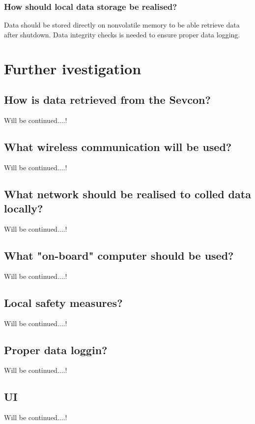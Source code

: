 \subsubsection*{How should local data storage be realised?}
Data should be stored directly on nonvolatile memory to be able retrieve data after shutdown.
Data integrity checks is needed to ensure proper data logging.


\section{Further ivestigation}


\subsection{How is data retrieved from the Sevcon?}
Will be continued....! 

\subsection{What wireless communication will be used?}
Will be continued....!

\subsection{What network should be realised to colled data locally?}
Will be continued....!

\subsection{What "on-board" computer should be used?}
Will be continued....!

\subsection{Local safety measures?}
Will be continued....!

\subsection{Proper data loggin?}
Will be continued....!

\subsection{UI}
Will be continued....!

